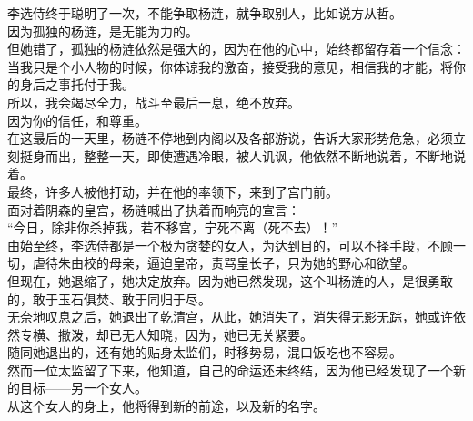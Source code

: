 \begin{multicols}{\theparacolNo}
李选侍终于聪明了一次，不能争取杨涟，就争取别人，比如说方从哲。\\

因为孤独的杨涟，是无能为力的。\\

但她错了，孤独的杨涟依然是强大的，因为在他的心中，始终都留存着一个信念：\\

当我只是个小人物的时候，你体谅我的激奋，接受我的意见，相信我的才能，将你的身后之事托付于我。\\

所以，我会竭尽全力，战斗至最后一息，绝不放弃。\\

因为你的信任，和尊重。\\

在这最后的一天里，杨涟不停地到内阁以及各部游说，告诉大家形势危急，必须立刻挺身而出，整整一天，即使遭遇冷眼，被人讥讽，他依然不断地说着，不断地说着。\\

最终，许多人被他打动，并在他的率领下，来到了宫门前。\\

面对着阴森的皇宫，杨涟喊出了执着而响亮的宣言：\\

“今日，除非你杀掉我，若不移宫，宁死不离（死不去）！”\\

由始至终，李选侍都是一个极为贪婪的女人，为达到目的，可以不择手段，不顾一切，虐待朱由校的母亲，逼迫皇帝，责骂皇长子，只为她的野心和欲望。\\

但现在，她退缩了，她决定放弃。因为她已然发现，这个叫杨涟的人，是很勇敢的，敢于玉石俱焚、敢于同归于尽。\\

无奈地叹息之后，她退出了乾清宫，从此，她消失了，消失得无影无踪，她或许依然专横、撒泼，却已无人知晓，因为，她已无关紧要。\\

随同她退出的，还有她的贴身太监们，时移势易，混口饭吃也不容易。\\

然而一位太监留了下来，他知道，自己的命运还未终结，因为他已经发现了一个新的目标——另一个女人。\\

从这个女人的身上，他将得到新的前途，以及新的名字。\\
\ifnum{}
	\end{multicols}
\fi
\newpage

